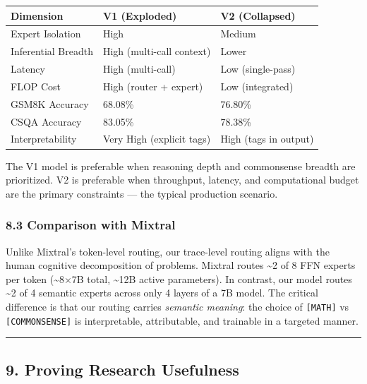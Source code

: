 {\def\LTcaptype{none} %
\begin{longtable}[]{@{}lll@{}}
\toprule\noalign{}
Dimension & V1 (Exploded) & V2 (Collapsed) \\
\midrule\noalign{}
\endhead
\bottomrule\noalign{}
\endlastfoot
Expert Isolation & High & Medium \\
Inferential Breadth & High (multi-call context) & Lower \\
Latency & High (multi-call) & Low (single-pass) \\
FLOP Cost & High (router + expert) & Low (integrated) \\
GSM8K Accuracy & 68.08\% & 76.80\% \\
CSQA Accuracy & 83.05\% & 78.38\% \\
Interpretability & Very High (explicit tags) & High (tags in output) \\
\end{longtable}
}

The V1 model is preferable when reasoning depth and commonsense breadth
are prioritized. V2 is preferable when throughput, latency, and
computational budget are the primary constraints --- the typical
production scenario.

\subsubsection{8.3 Comparison with
Mixtral}\label{comparison-with-mixtral}

Unlike Mixtral's token-level routing, our trace-level routing aligns
with the human cognitive decomposition of problems. Mixtral routes
\textasciitilde2 of 8 FFN experts per token (\textasciitilde8×7B total,
\textasciitilde12B active parameters). In contrast, our model routes
\textasciitilde2 of 4 semantic experts across only 4 layers of a 7B
model. The critical difference is that our routing carries
\emph{semantic meaning}: the choice of \texttt{{[}MATH{]}} vs
\texttt{{[}COMMONSENSE{]}} is interpretable, attributable, and trainable
in a targeted manner.

\begin{center}\rule{0.5\linewidth}{0.5pt}\end{center}

\subsection{9. Proving Research
Usefulness}\label{proving-research-usefulness}

